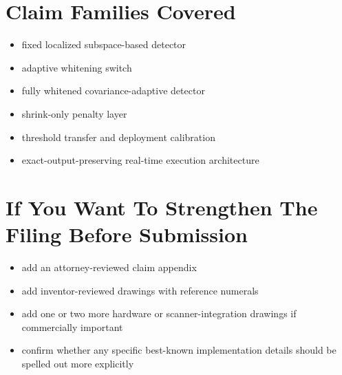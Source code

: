 \documentclass[11pt]{article}
\begin{document}
\section*{Claim Families Covered}
\begin{itemize}
\item fixed localized subspace-based detector
\item adaptive whitening switch
\item fully whitened covariance-adaptive detector
\item shrink-only penalty layer
\item threshold transfer and deployment calibration
\item exact-output-preserving real-time execution architecture
\end{itemize}

\section*{If You Want To Strengthen The Filing Before Submission}
\begin{itemize}
\item add an attorney-reviewed claim appendix
\item add inventor-reviewed drawings with reference numerals
\item add one or two more hardware or scanner-integration drawings if commercially important
\item confirm whether any specific best-known implementation details should be spelled out more explicitly
\end{itemize}
\end{document}
